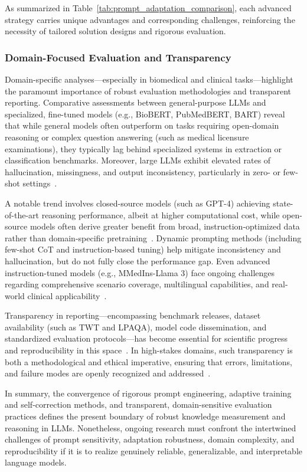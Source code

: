 As summarized in Table~\ref{tab:prompt_adaptation_comparison}, each advanced strategy carries unique advantages and corresponding challenges, reinforcing the necessity of tailored solution designs and rigorous evaluation.

\subsubsection{Domain-Focused Evaluation and Transparency}

Domain-specific analyses---especially in biomedical and clinical tasks---highlight the paramount importance of robust evaluation methodologies and transparent reporting. Comparative assessments between general-purpose LLMs and specialized, fine-tuned models (e.g., BioBERT, PubMedBERT, BART) reveal that while general models often outperform on tasks requiring open-domain reasoning or complex question answering (such as medical licensure examinations), they typically lag behind specialized systems in extraction or classification benchmarks. Moreover, large LLMs exhibit elevated rates of hallucination, missingness, and output inconsistency, particularly in zero- or few-shot settings~\cite{ref94,ref95}.

A notable trend involves closed-source models (such as GPT-4) achieving state-of-the-art reasoning performance, albeit at higher computational cost, while open-source models often derive greater benefit from broad, instruction-optimized data rather than domain-specific pretraining~\cite{ref94}. Dynamic prompting methods (including few-shot CoT and instruction-based tuning) help mitigate inconsistency and hallucination, but do not fully close the performance gap. Even advanced instruction-tuned models (e.g., MMedIns-Llama 3) face ongoing challenges regarding comprehensive scenario coverage, multilingual capabilities, and real-world clinical applicability~\cite{ref95}.

Transparency in reporting---encompassing benchmark releases, dataset availability (such as TWT and LPAQA), model code dissemination, and standardized evaluation protocols---has become essential for scientific progress and reproducibility in this space~\cite{ref96,ref98,ref95}. In high-stakes domains, such transparency is both a methodological and ethical imperative, ensuring that errors, limitations, and failure modes are openly recognized and addressed~\cite{ref94,ref95,ref96,ref98}.

In summary, the convergence of rigorous prompt engineering, adaptive training and self-correction methods, and transparent, domain-sensitive evaluation practices defines the present boundary of robust knowledge measurement and reasoning in LLMs. Nonetheless, ongoing research must confront the intertwined challenges of prompt sensitivity, adaptation robustness, domain complexity, and reproducibility if it is to realize genuinely reliable, generalizable, and interpretable language models.

